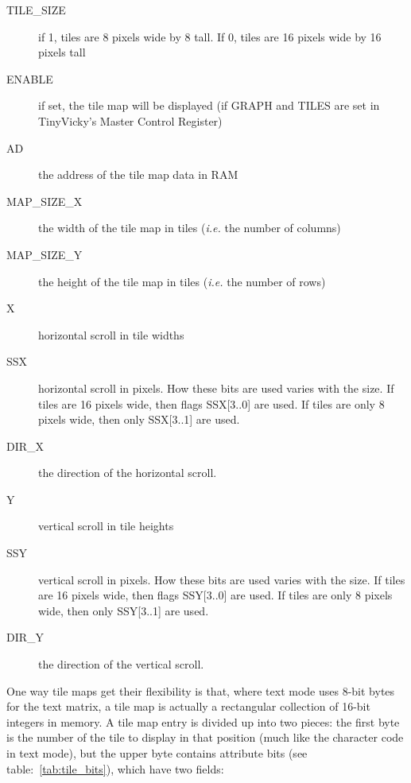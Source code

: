 \begin{description}
    \item[TILE\_SIZE] if 1, tiles are 8 pixels wide by 8 tall. If 0, tiles are 16 pixels wide by 16 pixels tall

    \item[ENABLE] if set, the tile map will be displayed (if GRAPH and TILES are set in TinyVicky's Master Control Register)

    \item[AD] the address of the tile map data in RAM

    \item[MAP\_SIZE\_X] the width of the tile map in tiles ({\it i.e.} the number of columns)

    \item[MAP\_SIZE\_Y] the height of the tile map in tiles ({\it i.e.} the number of rows)

    \item[X] horizontal scroll in tile widths

    \item[SSX] horizontal scroll in pixels. How these bits are used varies with the size. If tiles are 16 pixels wide, then flags SSX[3..0] are used. If tiles are only 8 pixels wide, then only SSX[3..1] are used.

    \item[DIR\_X] the direction of the horizontal scroll.

    \item[Y] vertical scroll in tile heights

    \item[SSY] vertical scroll in pixels. How these bits are used varies with the size. If tiles are 16 pixels wide, then flags SSY[3..0] are used. If tiles are only 8 pixels wide, then only SSY[3..1] are used.

    \item[DIR\_Y] the direction of the vertical scroll.

\end{description}

One way tile maps get their flexibility is that, where text mode uses 8-bit bytes for the text matrix, a tile map is actually a rectangular collection of 16-bit integers in memory. A tile map entry is divided up into two pieces: the first byte is the number of the tile to display in that position (much like the character code in text mode), but the upper byte contains attribute bits (see table:~\ref{tab:tile_bits}), which have two fields:

